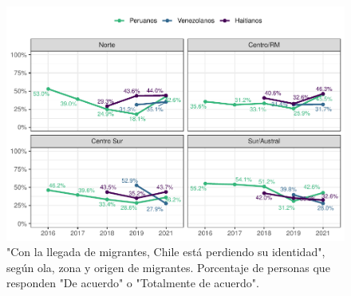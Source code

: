 \documentclass[
  12pt,
]{book}
\begin{document}
\begin{figure}

{\centering \includegraphics{reporte-elsoc_files/figure-latex/amen2-zona-1} 

}

\caption{"Con la llegada de migrantes, Chile está perdiendo su identidad", según ola, zona y origen de migrantes. Porcentaje de personas que responden "De acuerdo" o "Totalmente de acuerdo".}\label{fig:amen2-zona}
\end{figure}
\end{document}
